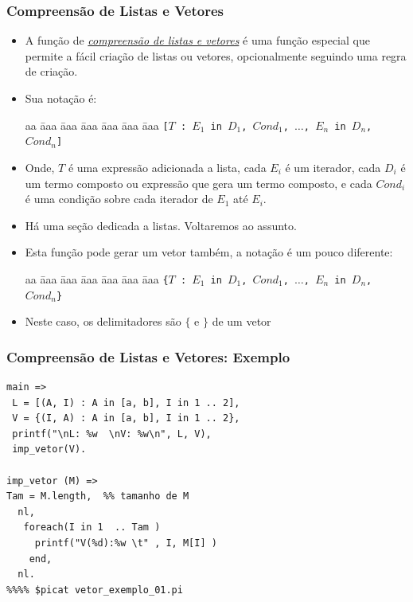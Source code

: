 \begin{frame}[c,allowframebreaks]

\frametitle{Compreensão de Listas e Vetores}    
    
\begin{itemize}    
    \item A função de \underline{\textit{compreensão de listas e vetores}} é uma função especial que  permite a fácil criação de listas ou vetores, opcionalmente seguindo uma regra de 
    criação.
    
    \item Sua notação é:
    
    \begin{tabbing}
        aa \= aaa \= aaa \= aaa \= aaa \= aaa \= aaa \kill
        \> \> \texttt{[$T$ : $E_1$ \texttt{in} $D_1$, $Cond_1$, $\ldots$, $E_n$ in $D_n$, $Cond_n$]} 
    \end{tabbing}
    
    \item Onde, $T$ é uma expressão  adicionada a lista, cada $E_i$ é um 
    iterador, cada $D_i$ é um termo composto ou expressão que gera um termo composto, e cada $Cond_i$ é uma condição sobre cada iterador de $E_1$ até $E_i$.
    
    \item Há uma seção dedicada a listas. Voltaremos ao assunto.
    
    \framebreak

    \item Esta função pode gerar um vetor também, a notação é um pouco diferente:
    
    \begin{tabbing}
        aa \= aaa \= aaa \= aaa \= aaa \= aaa \= aaa \kill
        \> \> \texttt{\{$T$ : $E_1$ \texttt{in} $D_1$, $Cond_1$, $\ldots$, $E_n$ in $D_n$, $Cond_n$\}} 
    \end{tabbing}
    
    \item Neste caso, os delimitadores são $\{$ e $\}$ de um vetor

\end{itemize}

\end{frame}      

 \begin{frame}[fragile]
 \frametitle{Compreensão de Listas e Vetores: Exemplo}
\begin{footnotesize}

\begin{verbatim}
main =>
 L = [(A, I) : A in [a, b], I in 1 .. 2],
 V = {(I, A) : A in [a, b], I in 1 .. 2},
 printf("\nL: %w  \nV: %w\n", L, V),
 imp_vetor(V).

imp_vetor (M) => 
Tam = M.length,  %% tamanho de M
  nl,
   foreach(I in 1  .. Tam )
     printf("V(%d):%w \t" , I, M[I] )
    end,
  nl.
%%%% $picat vetor_exemplo_01.pi
\end{verbatim}

\end{footnotesize}
 
\end{frame}


